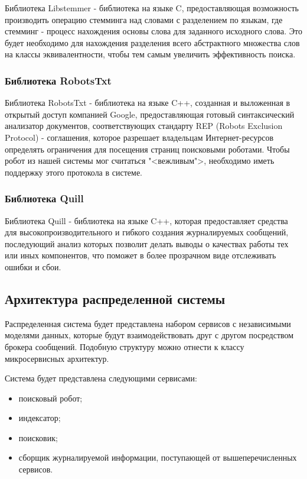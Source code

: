 Библиотека Libstemmer - библиотека на языке C, предоставляющая возможность производить операцию стемминга над словами с разделением по языкам, где стемминг - процесс нахождения основы слова для заданного исходного слова. Это будет необходимо для нахождения разделения всего абстрактного множества слов на классы эквивалентности, чтобы тем самым увеличить эффективность поиска. 

\subsubsection{Библиотека RobotsTxt}

Библиотека RobotsTxt - библиотека на языке C++, созданная и выложенная в открытый доступ компанией Google, предоставляющая готовый синтаксический анализатор документов, соответствующих стандарту REP (Robots Exclusion Protocol) - соглашения, которое разрешает владельцам Интернет-ресурсов определять ограничения для посещения страниц поисковыми роботами. Чтобы робот из нашей системы мог считаться "<вежливым">, необходимо иметь поддержку этого протокола в системе.

\subsubsection{Библиотека Quill}
Библиотека Quill - библиотека на языке C++, которая предоставляет средства для высокопроизводительного и гибкого создания журналируемых сообщений, последующий анализ которых позволит делать выводы о качествах работы тех или иных компонентов, что поможет в более прозрачном виде отслеживать ошибки и сбои.

\subsection{Архитектура распределенной системы}

Распределенная система будет представлена набором сервисов с независимыми моделями данных, которые будут взаимодействовать друг с другом посредством брокера сообщений. Подобную структуру можно отнести к классу микросервисных архитектур.

Система будет представлена следующими сервисами:
\begin{itemize}
\item поисковый робот;
\item индексатор;
\item поисковик;
\item сборщик журналируемой информации, поступающей от вышеперечисленных сервисов.
\end{itemize}

